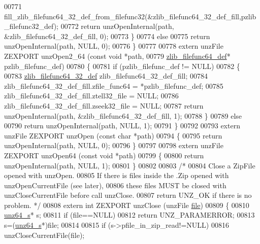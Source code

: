 \begin{DoxyCode}
00771         fill\_zlib\_filefunc64\_32\_def\_from\_filefunc32(&zlib\_filefunc64\_32\_def\_fill,pzlib\_filefunc32\_def);
00772         \textcolor{keywordflow}{return} unzOpenInternal(path, &zlib\_filefunc64\_32\_def\_fill, 0);
00773     \}
00774     \textcolor{keywordflow}{else}
00775         \textcolor{keywordflow}{return} unzOpenInternal(path, NULL, 0);
00776 \}
00777 
00778 \textcolor{keyword}{extern} unzFile ZEXPORT unzOpen2\_64 (\textcolor{keyword}{const} \textcolor{keywordtype}{void} *path,
00779                                      \hyperlink{structzlib__filefunc64__def__s}{zlib\_filefunc64\_def}* pzlib\_filefunc\_def)
00780 \{
00781     \textcolor{keywordflow}{if} (pzlib\_filefunc\_def != NULL)
00782     \{
00783         \hyperlink{structzlib__filefunc64__32__def__s}{zlib\_filefunc64\_32\_def} zlib\_filefunc64\_32\_def\_fill;
00784         zlib\_filefunc64\_32\_def\_fill.zfile\_func64 = *pzlib\_filefunc\_def;
00785         zlib\_filefunc64\_32\_def\_fill.ztell32\_file = NULL;
00786         zlib\_filefunc64\_32\_def\_fill.zseek32\_file = NULL;
00787         \textcolor{keywordflow}{return} unzOpenInternal(path, &zlib\_filefunc64\_32\_def\_fill, 1);
00788     \}
00789     \textcolor{keywordflow}{else}
00790         \textcolor{keywordflow}{return} unzOpenInternal(path, NULL, 1);
00791 \}
00792 
00793 \textcolor{keyword}{extern} unzFile ZEXPORT unzOpen (\textcolor{keyword}{const} \textcolor{keywordtype}{char} *path)
00794 \{
00795     \textcolor{keywordflow}{return} unzOpenInternal(path, NULL, 0);
00796 \}
00797 
00798 \textcolor{keyword}{extern} unzFile ZEXPORT unzOpen64 (\textcolor{keyword}{const} \textcolor{keywordtype}{void} *path)
00799 \{
00800     \textcolor{keywordflow}{return} unzOpenInternal(path, NULL, 1);
00801 \}
00802 
00803 \textcolor{comment}{/*}
00804 \textcolor{comment}{  Close a ZipFile opened with unzOpen.}
00805 \textcolor{comment}{  If there is files inside the .Zip opened with unzOpenCurrentFile (see later),}
00806 \textcolor{comment}{    these files MUST be closed with unzCloseCurrentFile before call unzClose.}
00807 \textcolor{comment}{  return UNZ\_OK if there is no problem. */}
00808 \textcolor{keyword}{extern} \textcolor{keywordtype}{int} ZEXPORT unzClose (unzFile \hyperlink{structfile}{file})
00809 \{
00810     \hyperlink{structunz64__s}{unz64\_s}* s;
00811     \textcolor{keywordflow}{if} (file==NULL)
00812         \textcolor{keywordflow}{return} UNZ\_PARAMERROR;
00813     s=(\hyperlink{structunz64__s}{unz64\_s}*)file;
00814 
00815     \textcolor{keywordflow}{if} (s->pfile\_in\_zip\_read!=NULL)
00816         unzCloseCurrentFile(file);

\end{DoxyCode}
